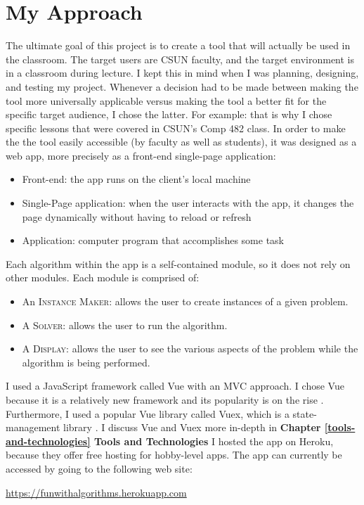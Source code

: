 \section{My Approach}
\hspace{-0.25in}The ultimate goal of this project is to create a tool that will actually be used 
in the classroom. The target users are CSUN faculty, and the target environment 
is in a classroom during lecture.
I kept this in mind when I was planning, designing, and testing my project. 
Whenever a decision had to be made between 
making the tool more universally applicable 
versus making the tool a better fit for the specific target audience,
I chose the latter. For example: that is why I chose 
specific lessons that were covered in CSUN's Comp 482 class.
\newline\newline
In order to make the the tool easily accessible (by faculty as well as students), 
it was designed as a web app, more precisely as a front-end single-page application:
\begin{itemize}
	\item Front-end: the app runs on the client's local machine
	\item Single-Page application: when the user interacts with the app,
		it changes the page dynamically without having to reload or refresh 
	\item Application: computer program that accomplishes some task
\end{itemize}
Each algorithm within the app is a self-contained module, so
it does not rely on other modules.
Each module is comprised of:
\begin{itemize}
	\item An \textsc{Instance Maker}: allows the user to create 
		instances of a given problem.
	\item A \textsc{Solver}: allows the user to run the algorithm.
	\item A \textsc{Display}: allows the user to see the various aspects
		of the problem while the algorithm is being performed.
\end{itemize} 
I used a JavaScript framework called Vue with an MVC approach.
I chose Vue because it is a relatively new framework and 
its popularity is on the rise \cite{top-js-libraries}.
Furthermore, I used a popular Vue library called Vuex, which is 
a state-management library \cite{vue}.
I discuss Vue and Vuex more in-depth in
\textbf{Chapter \ref{tools-and-technologies} Tools and Technologies}
I hosted the app on Heroku, because they offer free hosting for hobby-level apps. 
The app can currently be accessed by going to the following web site:
\begin{center}

\underline{https://funwithalgorithms.herokuapp.com}
	
\end{center}
